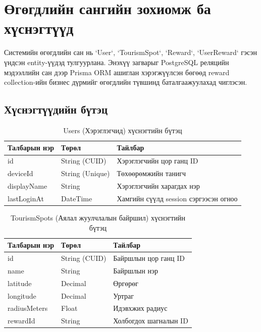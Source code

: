 \section{Өгөгдлийн сангийн зохиомж ба хүснэгтүүд}
\begin{sloppy}

Системийн өгөгдлийн сан нь `User`, `TourismSpot`, `Reward`, `UserReward` гэсэн үндсэн entity-үүдэд тулгуурлана. Энэхүү загварыг PostgreSQL реляцийн мэдээллийн сан дээр Prisma ORM ашиглан хэрэгжүүлсэн бөгөөд reward collection-ийн бизнес дүрмийг өгөгдлийн түвшинд баталгаажуулахад чиглэсэн.

\subsection{Хүснэгтүүдийн бүтэц}

\begin{table}[H]
    \centering
    \caption{Users (Хэрэглэгчид) хүснэгтийн бүтэц}
    \label{tab:users_table}
    \begin{tabular}{|l|l|l|}
        \hline
        \textbf{Талбарын нэр} & \textbf{Төрөл} & \textbf{Тайлбар} \\ \hline
        id & String (CUID) & Хэрэглэгчийн цор ганц ID \\ \hline
        deviceId & String (Unique) & Төхөөрөмжийн танигч \\ \hline
        displayName & String & Хэрэглэгчийн харагдах нэр \\ \hline
        lastLoginAt & DateTime & Хамгийн сүүлд session сэргээсэн огноо \\ \hline
    \end{tabular}
\end{table}

\begin{table}[H]
    \centering
    \caption{TourismSpots (Аялал жуулчлалын байршил) хүснэгтийн бүтэц}
    \label{tab:tourism_spots_table}
    \begin{tabular}{|l|l|l|}
        \hline
        \textbf{Талбарын нэр} & \textbf{Төрөл} & \textbf{Тайлбар} \\ \hline
        id & String (CUID) & Байршлын цор ганц ID \\ \hline
        name & String & Байршлын нэр \\ \hline
        latitude & Decimal & Өргөрөг \\ \hline
        longitude & Decimal & Уртраг \\ \hline
        radiusMeters & Float & Идэвхжих радиус \\ \hline
        rewardId & String & Холбогдох шагналын ID \\ \hline
    \end{tabular}
\end{table}


\end{sloppy}
